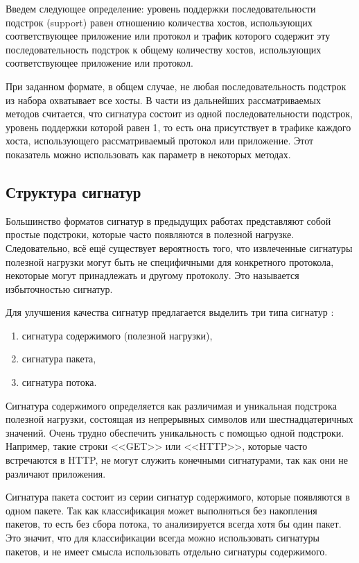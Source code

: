 Введем следующее определение: уровень поддержки последовательности подстрок (support) равен отношению количества хостов,
использующих соответствующее приложение или протокол и трафик которого содержит эту последовательность подстрок
к общему количеству хостов, использующих соответствующее приложение или протокол.

При заданном формате, в общем случае, не любая последовательность подстрок из набора охватывает все хосты.
В части из дальнейших рассматриваемых методов считается, что сигнатура состоит из одной последовательности подстрок,
уровень поддержки которой равен 1, то есть она присутствует в трафике каждого хоста, использующего рассматриваемый протокол
или приложение. Этот показатель можно использовать как параметр в некоторых методах.

\subsection{Структура сигнатур}

Большинство форматов сигнатур в предыдущих работах \cite{park2008towards,ye2009autosig,santosautomatic}
представляют собой простые подстроки, которые часто появляются в полезной нагрузке.
Следовательно, всё ещё существует вероятность того, что извлеченные сигнатуры полезной нагрузки могут быть не специфичными
для конкретного протокола, некоторые могут принадлежать и другому протоколу. Это называется избыточностью сигнатур.

Для улучшения качества сигнатур предлагается выделить три типа сигнатур \cite{goo2016payload, shim2019automatic}:

\begin{enumerate}
    \item сигнатура содержимого (полезной нагрузки),
    \item сигнатура пакета,
    \item сигнатура потока.
\end{enumerate}

Сигнатура содержимого определяется как различимая и уникальная подстрока полезной нагрузки, состоящая из непрерывных символов или
шестнадцатеричных значений. Очень трудно обеспечить уникальность с помощью одной подстроки. Например,
такие строки <<GET>>  или <<HTTP>>, которые часто встречаются в HTTP, не могут служить конечными сигнатурами,
так как они не различают приложения.

Сигнатура пакета состоит из серии сигнатур содержимого, которые появляются в одном пакете.
Так как классификация может выполняться без накопления пакетов, то есть без сбора потока, то анализируется всегда хотя бы один пакет.
Это значит, что для классификации всегда можно использовать сигнатуры пакетов, и не имеет смысла использовать отдельно сигнатуры
содержимого.

